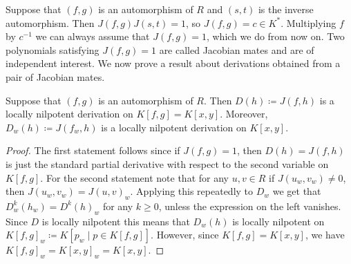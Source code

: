 \documentclass[a4paper,10pt]{amsart}
\begin{document}
Suppose that \((f,g)\) is an automorphism of \(R\) and \((s,t)\) is the inverse automorphism. Then \(J(f,g)J(s,t)=1\), so \(J(f,g)=c\in K^*\). Multiplying \(f\) by \(c^{-1}\) we can always
assume that \(J(f,g)=1\), which we do from now on. Two polynomials satisfying \(J(f,g)=1\) are called Jacobian mates and are of independent interest. We now prove a result about
derivations obtained from a pair of Jacobian mates.
\begin{proposition}\label{prop:jac-mates}
  Suppose that \((f,g)\) is an automorphism of \(R\). Then \(D(h)\coloneqq J(f,h)\) is a locally nilpotent derivation on \(K[f,g]=K[x,y]\).
  Moreover, \(D_w(h)\coloneqq J(f_w,h)\) is a locally nilpotent derivation on \(K[x,y]\).
\end{proposition}
\begin{proof}
  The first statement follows since if \(J(f,g)=1\), then \(D(h)=J(f,h)\) is just the standard partial derivative with respect to the second variable on \(K[f,g]\). For the second statement note that
  for any \(u,v\in R\)
  if \(J(u_w,v_w)\ne 0\), then \(J(u_w,v_w)=J(u,v)_w\). 
  Applying this repeatedly to \(D_w\) we get that 
  \(D_w^k(h_w)=D^k(h)_w\) for any \(k\ge 0\), unless the expression on the left vanishes. Since \(D\) is locally nilpotent 
  this means that \(D_w(h)\) is locally nilpotent on \(K[f,g]_w\coloneqq K[p_w\mid p\in K[f,g]]\). However, since \(K[f,g]=K[x,y]\), we have
  \(K[f,g]_w=K[x,y]_w=K[x,y]\).
\end{proof}
\end{document}
